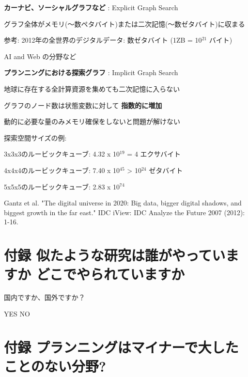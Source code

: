 \begin{container-fluid}
\begin{row-fluid}
\begin{span4}
\textbf{カーナビ、ソーシャルグラフなど} : Explicit Graph Search

グラフ全体がメモリ(〜数ペタバイト)または二次記憶(〜数ゼタバイト)に収まる

参考: 2012年の全世界のデジタルデータ: 数ゼタバイト (1ZB = 10$^{\text{21}}$ バイト)

AI and Web の分野など
\end{span4}
\begin{span8}
\textbf{プランニングにおける探索グラフ} : Implicit Graph Search

地球に存在する全計算資源を集めても二次記憶に入らない

グラフのノード数は状態変数に対して \textbf{指数的に増加}

動的に必要な量のみメモリ確保をしないと問題が解けない

探索空間サイズの例:

3x3x3のルービックキューブ: 4.32 x 10$^{\text{19}}$ = 4 エクサバイト

4x4x4のルービックキューブ: 7.40 x 10$^{\text{45}}$ > 10$^{\text{24}}$ ゼタバイト

5x5x5のルービックキューブ: 2.83 x 10$^{\text{74}}$
\end{span8}
\end{row-fluid}
\end{container-fluid}


\begin{note}
Gantz et al. "The digital universe in 2020: Big data, bigger digital shadows, and biggest growth in the far east." IDC iView: IDC Analyze the Future 2007 (2012): 1-16.
\end{note}


\section{付録 似たような研究は誰がやっていますか どこでやられていますか}
\label{sec-18}


\begin{xlarge}
国内ですか、国外ですか？
\begin{center}
YES NO
\end{center}
\end{xlarge}

\section{付録 プランニングはマイナーで大したことのない分野?}
\label{sec-19}

